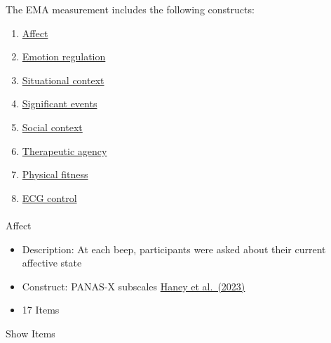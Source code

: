 \documentclass[
  letterpaper,
  DIV=11,
  numbers=noendperiod]{scrartcl}
\makeatletter
\let\oldparagraph\paragraph
\renewcommand{\paragraph}{
    \@ifstar
      \xxxParagraphStar
      \xxxParagraphNoStar
  }
\newcommand{\xxxParagraphStar}[1]{\oldparagraph*{#1}\mbox{}}
\newcommand{\xxxParagraphNoStar}[1]{\oldparagraph{#1}\mbox{}}
\providecommand{\tightlist}{%
  \setlength{\itemsep}{0pt}\setlength{\parskip}{0pt}}
\makeatother
\begin{document}
The EMA measurement includes the following constructs:

\begin{enumerate}
\def\labelenumi{\arabic{enumi}.}
\tightlist
\item
  \hyperref[affect]{Affect}
\item
  \hyperref[emotion-regulation]{Emotion regulation}
\item
  \hyperref[situational-context]{Situational context}
\item
  \hyperref[significant-events]{Significant events}
\item
  \hyperref[social-context]{Social context}
\item
  \hyperref[therapeutic-agency]{Therapeutic agency}
\item
  \hyperref[physical-fitness]{Physical fitness}
\item
  \hyperref[ecg-control]{ECG control}
\end{enumerate}

\paragraph{Affect}\label{affect}

\begin{itemize}
\item
  Description: At each beep, participants were asked about their current
  affective state
\item
  Construct: PANAS-X subscales
  \href{https://doi.org/10.1037/pas0001231}{Haney et al.~(2023)}
\item
  17 Items
\end{itemize}

Show Items
\end{document}
